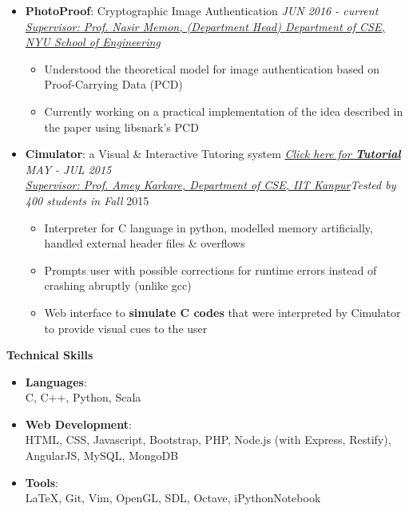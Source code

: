 \documentclass[letterpaper,11pt]{article}
\begin{document}
{\begin{itemize}
    \item \textbf{PhotoProof}: Cryptographic Image Authentication \hfill \textit{JUN 2016 - current}\\
    \href{http://engineering.nyu.edu/people/nasir-memon}{\textit{Supervisor: Prof. Nasir Memon, (Department Head) Department of CSE, NYU School of Engineering}}
    \begin{itemize}
        \item Understood the theoretical model for image authentication based on Proof-Carrying Data (PCD)
        \item Currently working on a practical implementation of the idea described in the paper using libsnark's PCD
    \end{itemize}
    \item \textbf{Cimulator}: a Visual \& Interactive Tutoring system\hspace{0.2in} \href{http://home.iitk.ac.in/~kunalkap/Cimulator.html}{\textit{Click here for \textbf{Tutorial}}} \hfill \textit{MAY - JUL 2015} \\
    \href{http://www.cse.iitk.ac.in/users/karkare/}{\textit{Supervisor: Prof. Amey Karkare, Department of CSE, IIT Kanpur}}\hfill \textit{Tested by 400 students in Fall} 2015\\
        \begin{itemize}
            \item Interpreter for C language in python, modelled memory artificially, handled external header files \& overflows
            \item Prompts user with possible corrections for runtime errors instead of crashing abruptly (unlike gcc)
            \item Web interface to \textbf{simulate C codes} that were interpreted by Cimulator to provide visual cues to the user
        \end{itemize}
\end{itemize}

\Large{\textbf{Technical Skills}}
\small
\vspace{-2pt}
\begin{itemize}
    \item \textbf{Languages}:\\
        C, C++, Python, Scala
    \item \textbf{Web Development}:\\
        HTML, CSS, Javascript, Bootstrap, PHP, Node.js (with Express, Restify), AngularJS, MySQL, MongoDB
    \item \textbf{Tools}:\\
        \LaTeX, Git, Vim, OpenGL, SDL, Octave, iPythonNotebook
\end{itemize}

}
\end{document}
